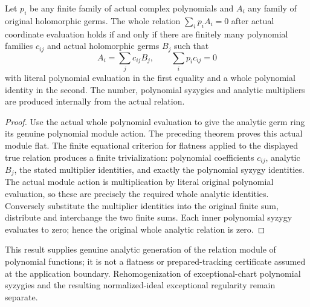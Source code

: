 \begin{theorem}
\label{hir:actual-original-analytic-polynomial-relation-generation}
\leanok
Let $p_i$ be any finite family of actual complex polynomials and $A_i$
any family of original holomorphic germs. The whole relation
$\sum_i p_i A_i=0$ after actual coordinate evaluation holds if and only
if there are finitely many polynomial families $c_{ij}$ and actual
holomorphic germs $B_j$ such that
\[
 A_i=\sum_j c_{ij}B_j,\qquad \sum_i p_i c_{ij}=0
\]
with literal polynomial evaluation in the first equality and a whole
polynomial identity in the second. The number, polynomial syzygies and
analytic multipliers are produced internally from the actual relation.
\end{theorem}
\begin{proof}
Use the actual whole polynomial evaluation to give the analytic germ
ring its genuine polynomial module action. The preceding theorem proves
this actual module flat. The finite equational criterion for flatness
applied to the displayed true relation produces a finite trivialization:
polynomial coefficients $c_{ij}$, analytic $B_j$, the stated multiplier
identities, and exactly the polynomial syzygy identities. The actual
module action is multiplication by literal original polynomial
evaluation, so these are precisely the required whole analytic
identities. Conversely substitute the multiplier identities into the
original finite sum, distribute and interchange the two finite sums.
Each inner polynomial syzygy evaluates to zero; hence the original
whole analytic relation is zero.
\end{proof}

\begin{remark}
This result supplies genuine analytic generation of the relation module
of polynomial functions; it is not a flatness or prepared-tracking
certificate assumed at the application boundary. Rehomogenization of
exceptional-chart polynomial syzygies and the resulting normalized-ideal
exceptional regularity remain separate.
\end{remark}
